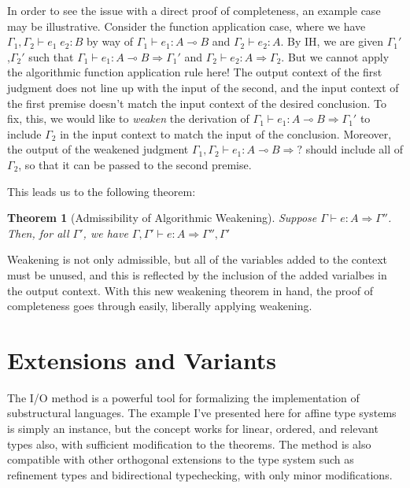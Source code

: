 \documentclass{article}
\newtheorem{theorem}{Theorem}
\theoremstyle{definition}
\newcommand{\loli}{\multimap}
\newcommand{\gens}{\Rightarrow}
\begin{document}
In order to see the issue with a direct proof of completeness, an example case may be illustrative. Consider the function application case, where we have
$\Gamma_1,\Gamma_2 \vdash e_1 \; e_2 : B$ by way of $\Gamma_1 \vdash e_1 : A \loli B$ and $\Gamma_2 \vdash e_2 : A$. By IH, we are given $\Gamma_1'$,$\Gamma_2'$ such that
$\Gamma_1 \vdash e_1 : A \loli B \gens \Gamma_1'$ and $\Gamma_2 \vdash e_2 : A \gens \Gamma_2$. But we cannot apply the algorithmic function application rule here! The output context of the first judgment does not line up with the input of the second, and the input context of the first premise doesn't match the input context of the desired conclusion. To fix, this, we would like to \textit{weaken} the derivation of $\Gamma_1 \vdash e_1 : A \loli B \gens \Gamma_1'$ to include $\Gamma_2$ in the input context to match the input of the conclusion. Moreover, the output of the weakened judgment $\Gamma_1,\Gamma_2 \vdash e_1 : A \loli B \gens ?$ should include all of $\Gamma_2$, so that it can be passed to the second premise.

This leads us to the following theorem:
\begin{theorem}[Admissibility of Algorithmic Weakening]
Suppose $\Gamma \vdash e : A \gens \Gamma''$. Then, for all $\Gamma'$, we have $\Gamma,\Gamma' \vdash e : A \gens \Gamma'', \Gamma'$
\end{theorem}

Weakening is not only admissible, but all of the variables added to the context must be unused, and this is reflected by the inclusion of the added varialbes in the output context. With this new weakening theorem in hand, the proof of completeness goes through easily, liberally applying weakening.

\section{Extensions and Variants}
The I/O method is a powerful tool for formalizing the implementation of substructural languages. The example I've presented here for affine type systems is simply an instance, but the concept works for linear, ordered, and relevant types also, with sufficient modification to the theorems. The method is also compatible with other orthogonal extensions to the type system such as refinement types and bidirectional typechecking, with only minor modifications.
\end{document}
